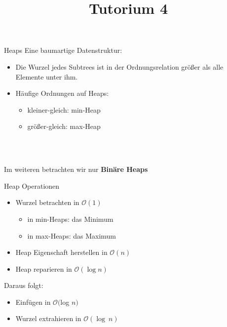 
\title[Algorithmen I SS 14]{Tutorium 4}

\usepackage{alltt}





\begin{frame}
  \maketitle
\end{frame}

\begin{frame}{Heaps}
	Eine baumartige Datenstruktur:
	\begin{itemize}
		\item Die Wurzel jedes Subtrees ist in der Ordnungsrelation größer als alle Elemente unter ihm.
		\item Häufige Ordnungen auf Heaps:
		\begin{itemize}
			\item kleiner-gleich: min-Heap
			\item größer-gleich: max-Heap
		\end{itemize}
	\end{itemize}
	\ \\
	\ \\
	\centerline{Im weiteren betrachten wir nur \textbf{Binäre Heaps}}

\end{frame}

\begin{frame} {Heap Operationen}
	\begin{itemize}
		\item Wurzel betrachten in $\mathcal{O}(1)$
		\begin{itemize}
			\item in min-Heaps: das Minimum
			\item in max-Heaps: das Maximum
		\end{itemize}
		\item Heap Eigenschaft herstellen in $\mathcal{O}(n)$
		\item Heap reparieren in $\mathcal{O}(\log  n)$
	\end{itemize}
	Daraus folgt:
	\begin{itemize}
		\item Einfügen in $\mathcal{O}($log $n )$
		\item Wurzel extrahieren in $\mathcal{O}( \log \ n)$
	\end{itemize}

\end{frame}

